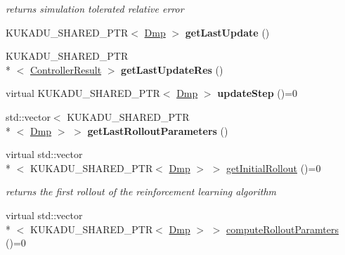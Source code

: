 \begin{DoxyCompactItemize}
\begin{DoxyCompactList}\small\item\em returns simulation tolerated relative error \end{DoxyCompactList}\item 
\hypertarget{classkukadu_1_1DMPReinforcer_abab6e2bd6abdd613335ecc7186e3d89c}{K\-U\-K\-A\-D\-U\-\_\-\-S\-H\-A\-R\-E\-D\-\_\-\-P\-T\-R$<$ \hyperlink{classkukadu_1_1Dmp}{Dmp} $>$ {\bfseries get\-Last\-Update} ()}\label{classkukadu_1_1DMPReinforcer_abab6e2bd6abdd613335ecc7186e3d89c}

\item 
\hypertarget{classkukadu_1_1DMPReinforcer_aa8722bbe4c69ca344c82a2e5aaa85d74}{K\-U\-K\-A\-D\-U\-\_\-\-S\-H\-A\-R\-E\-D\-\_\-\-P\-T\-R\\*
$<$ \hyperlink{classkukadu_1_1ControllerResult}{Controller\-Result} $>$ {\bfseries get\-Last\-Update\-Res} ()}\label{classkukadu_1_1DMPReinforcer_aa8722bbe4c69ca344c82a2e5aaa85d74}

\item 
\hypertarget{classkukadu_1_1DMPReinforcer_af88dad66482a357f0c4bcfc94aeac631}{virtual K\-U\-K\-A\-D\-U\-\_\-\-S\-H\-A\-R\-E\-D\-\_\-\-P\-T\-R$<$ \hyperlink{classkukadu_1_1Dmp}{Dmp} $>$ {\bfseries update\-Step} ()=0}\label{classkukadu_1_1DMPReinforcer_af88dad66482a357f0c4bcfc94aeac631}

\item 
\hypertarget{classkukadu_1_1DMPReinforcer_ad4032a5137fd6ff47b09455361e2ebe3}{std\-::vector$<$ K\-U\-K\-A\-D\-U\-\_\-\-S\-H\-A\-R\-E\-D\-\_\-\-P\-T\-R\\*
$<$ \hyperlink{classkukadu_1_1Dmp}{Dmp} $>$ $>$ {\bfseries get\-Last\-Rollout\-Parameters} ()}\label{classkukadu_1_1DMPReinforcer_ad4032a5137fd6ff47b09455361e2ebe3}

\item 
\hypertarget{classkukadu_1_1DMPReinforcer_a32bac8a17c007d40673b05f34ee017ca}{virtual std\-::vector\\*
$<$ K\-U\-K\-A\-D\-U\-\_\-\-S\-H\-A\-R\-E\-D\-\_\-\-P\-T\-R$<$ \hyperlink{classkukadu_1_1Dmp}{Dmp} $>$ $>$ \hyperlink{classkukadu_1_1DMPReinforcer_a32bac8a17c007d40673b05f34ee017ca}{get\-Initial\-Rollout} ()=0}\label{classkukadu_1_1DMPReinforcer_a32bac8a17c007d40673b05f34ee017ca}

\begin{DoxyCompactList}\small\item\em returns the first rollout of the reinforcement learning algorithm \end{DoxyCompactList}\item 
\hypertarget{classkukadu_1_1DMPReinforcer_abf1b944f57802f5ea3470be9746ad5ab}{virtual std\-::vector\\*
$<$ K\-U\-K\-A\-D\-U\-\_\-\-S\-H\-A\-R\-E\-D\-\_\-\-P\-T\-R$<$ \hyperlink{classkukadu_1_1Dmp}{Dmp} $>$ $>$ \hyperlink{classkukadu_1_1DMPReinforcer_abf1b944f57802f5ea3470be9746ad5ab}{compute\-Rollout\-Paramters} ()=0}\label{classkukadu_1_1DMPReinforcer_abf1b944f57802f5ea3470be9746ad5ab}


\end{DoxyCompactItemize}
